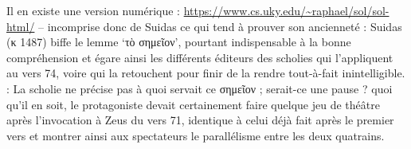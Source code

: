 {{Il en existe une version numérique : \url{https://www.cs.uky.edu/~raphael/sol/sol-html/} – incomprise donc de Suidas ce qui tend à prouver son ancienneté : Suidas (κ 1487) biffe le lemme `τὸ σημεῖον', pourtant indispensable à la bonne compréhension et égare ainsi les différents éditeurs des scholies qui l'appliquent au vers 74, voire qui la retouchent pour finir de la rendre tout-à-fait inintelligible.} : 
La scholie ne précise pas à quoi servait ce σημεῖον ; serait-ce une pause ? quoi qu'il en soit, le protagoniste devait certainement faire quelque jeu de théâtre après l'invocation à Zeus du vers 71, identique à celui déjà fait après le premier vers et montrer ainsi aux spectateurs le parallélisme entre les deux quatrains.}
